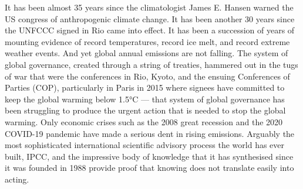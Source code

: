 \documentclass[a4paper, nobind]{templates/ociamthesis}
\begin{document}
It has been almost 35 years since the climatologist James E. Hansen warned the US congress of anthropogenic climate change. It has been another 30 years since the UNFCCC signed in Rio came into effect. It has been a succession of years of mounting evidence of record temperatures, record ice melt, and record extreme weather events. And yet global annual emissions are not falling. The system of global governance, created through a string of treaties, hammered out in the tugs of war that were the conferences in Rio, Kyoto, and the ensuing Conferences of Parties (COP), particularly in Paris in 2015 where signees have committed to keep the global warming below 1.5°C --- that system of global governance has been struggling to produce the urgent action that is needed to stop the global warming. Only economic crises such as the 2008 great recession and the 2020 COVID-19 pandemic have made a serious dent in rising emissions. Arguably the most sophisticated international scientific advisory process the world has ever built, IPCC, and the impressive body of knowledge that it has synthesised since it was founded in 1988 provide proof that knowing does not translate easily into acting.
\end{document}

